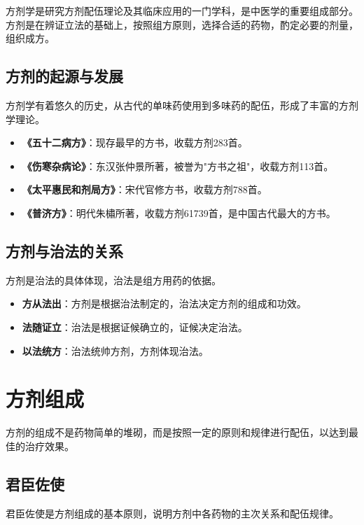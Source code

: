 \documentclass[12pt,UTF8]{ctexbook}
\begin{document}
方剂学是研究方剂配伍理论及其临床应用的一门学科，是中医学的重要组成部分。方剂是在辨证立法的基础上，按照组方原则，选择合适的药物，酌定必要的剂量，组织成方。

\subsection{方剂的起源与发展}

方剂学有着悠久的历史，从古代的单味药使用到多味药的配伍，形成了丰富的方剂学理论。

\begin{itemize}
\item \textbf{《五十二病方》}：现存最早的方书，收载方剂283首。
\item \textbf{《伤寒杂病论》}：东汉张仲景所著，被誉为"方书之祖"，收载方剂113首。
\item \textbf{《太平惠民和剂局方》}：宋代官修方书，收载方剂788首。
\item \textbf{《普济方》}：明代朱橚所著，收载方剂61739首，是中国古代最大的方书。
\end{itemize}

\subsection{方剂与治法的关系}

方剂是治法的具体体现，治法是组方用药的依据。

\begin{itemize}
\item \textbf{方从法出}：方剂是根据治法制定的，治法决定方剂的组成和功效。
\item \textbf{法随证立}：治法是根据证候确立的，证候决定治法。
\item \textbf{以法统方}：治法统帅方剂，方剂体现治法。
\end{itemize}

\section{方剂组成}

方剂的组成不是药物简单的堆砌，而是按照一定的原则和规律进行配伍，以达到最佳的治疗效果。

\subsection{君臣佐使}

君臣佐使是方剂组成的基本原则，说明方剂中各药物的主次关系和配伍规律。
\end{document}
